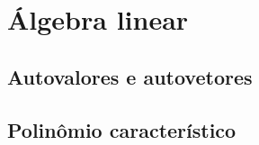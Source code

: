 \documentclass[12pt, a4paper]{article}
\begin{document}
	
	
	\section{Álgebra linear}
		\subsection{Autovalores e autovetores}
		
		
		\subsection{Polinômio característico}
		
	
\end{document}
